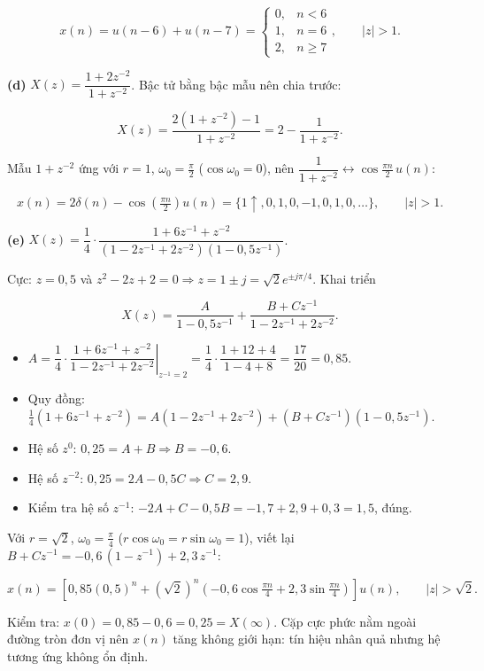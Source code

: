 \documentclass[12pt,a4paper]{article}
\begin{document}
\[x(n)=u(n-6)+u(n-7)=\begin{cases}0, & n<6\\ 1, & n=6\\ 2, & n\ge7\end{cases},\qquad |z|>1.\]

\textbf{(d)} \(X(z)=\dfrac{1+2z^{-2}}{1+z^{-2}}\). Bậc tử bằng bậc mẫu
nên chia trước:

\[X(z)=\frac{2(1+z^{-2})-1}{1+z^{-2}}=2-\frac{1}{1+z^{-2}}.\]

Mẫu \(1+z^{-2}\) ứng với \(r=1\), \(\omega_0=\tfrac{\pi}{2}\)
(\(\cos\omega_0=0\)), nên
\(\dfrac{1}{1+z^{-2}}\leftrightarrow\cos\tfrac{\pi n}{2}\,u(n)\):

\[x(n)=2\delta(n)-\cos\!\left(\tfrac{\pi n}{2}\right)u(n)=\{1\uparrow,0,1,0,-1,0,1,0,\dots\},\qquad |z|>1.\]

\textbf{(e)}
\(X(z)=\dfrac14\cdot\dfrac{1+6z^{-1}+z^{-2}}{(1-2z^{-1}+2z^{-2})(1-0{,}5z^{-1})}\).

Cực: \(z=0{,}5\) và
\(z^2-2z+2=0\Rightarrow z=1\pm j=\sqrt2e^{\pm j\pi/4}\). Khai triển

\[X(z)=\frac{A}{1-0{,}5z^{-1}}+\frac{B+Cz^{-1}}{1-2z^{-1}+2z^{-2}}.\]

\begin{itemize}
\item
  \(A=\left.\dfrac14\cdot\dfrac{1+6z^{-1}+z^{-2}}{1-2z^{-1}+2z^{-2}}\right|_{z^{-1}=2}=\dfrac14\cdot\dfrac{1+12+4}{1-4+8}=\dfrac{17}{20}=0{,}85\).
\item
  Quy đồng:
  \(\tfrac14(1+6z^{-1}+z^{-2})=A(1-2z^{-1}+2z^{-2})+(B+Cz^{-1})(1-0{,}5z^{-1})\).
\item
  Hệ số \(z^0\): \(0{,}25=A+B\Rightarrow B=-0{,}6\).
\item
  Hệ số \(z^{-2}\): \(0{,}25=2A-0{,}5C\Rightarrow C=2{,}9\).
\item
  Kiểm tra hệ số \(z^{-1}\): \(-2A+C-0{,}5B=-1{,}7+2{,}9+0{,}3=1{,}5\), đúng.
\end{itemize}

Với \(r=\sqrt2\), \(\omega_0=\tfrac{\pi}{4}\)
(\(r\cos\omega_0=r\sin\omega_0=1\)), viết lại
\(B+Cz^{-1}=-0{,}6\,(1-z^{-1})+2{,}3\,z^{-1}\):

\[x(n)=\left[0{,}85(0{,}5)^n+(\sqrt2)^n\left(-0{,}6\cos\tfrac{\pi n}{4}+2{,}3\sin\tfrac{\pi n}{4}\right)\right]u(n),\qquad |z|>\sqrt2.\]

Kiểm tra: \(x(0)=0{,}85-0{,}6=0{,}25=X(\infty)\). Cặp cực phức nằm ngoài đường
tròn đơn vị nên \(x(n)\) tăng không giới hạn: tín hiệu nhân quả nhưng hệ
tương ứng không ổn định.
\end{document}

